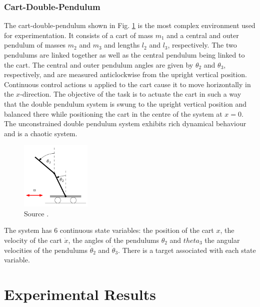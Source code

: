 \subsubsection{Cart-Double-Pendulum}
The cart-double-pendulum shown in Fig. \ref{Fig:cartDoublePendulum-environment} is the most complex environment used for experimentation. It consists of a cart of mass $m_1$ and a central and outer pendulum of masses $m_2$ and $m_3$ and lengths $l_2$ and $l_3$, respectively. The two pendulums are linked together as well as the central pendulum being linked to the cart.  The central and outer pendulum angles are given by $\theta_2$ and $\theta_3$, respectively, and are measured anticlockwise from the upright vertical position. Continuous control actions $u$ applied to the cart cause it to move horizontally in the $x$-direction. The objective of the task is to actuate the cart in such a way that the double pendulum system is swung to the upright vertical position and balanced there while positioning the cart in the centre of the system at $x=0$. The unconstrained double pendulum system exhibits rich dynamical behaviour and is a chaotic system.
\begin{figure}[H]
\centering    
\includegraphics[width=0.3\textwidth]{Chapter3/Figures/cart-double-pendulum.png}
\caption[Cart-double-pendulum PILCO environment]{Source \cite{deisenroth2013pilco-documentation}.}
\label{Fig:cartDoublePendulum-environment}
\end{figure}
The system has 6 continuous state variables: the position of the cart $x$, the velocity of the cart $\dot x$, the angles of the pendulums $\theta_2$ and $theta_3$ the angular velocities of the pendulums $\dot \theta_2$ and $\dot \theta_3$. There is a target associated with each state variable.


\section{Experimental Results}

